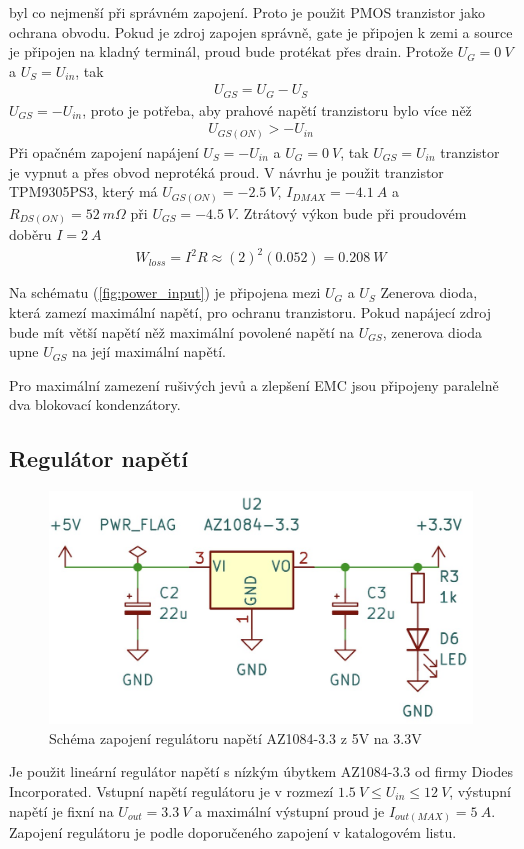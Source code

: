 byl co nejmenší při správném zapojení. Proto je použit PMOS tranzistor jako ochrana obvodu. Pokud je zdroj zapojen správně, gate je připojen k zemi a source je připojen na kladný terminál, proud bude protékat přes drain. Protože $ U_G = 0 \ V$ a $U_S = U_{in}$, tak
\begin{align*}
    U_{GS} = U_G - U_S
\end{align*}
$U_{GS} = -U_{in} $, proto je potřeba, aby prahové napětí tranzistoru bylo více něž
\begin{align*}
    U_{GS(ON)} > -U_{in}
\end{align*}
Při opačném zapojení napájení $U_S = -U_{in}$ a $ U_G = 0 \ V$, tak  $U_{GS} = U_{in}$ tranzistor je vypnut a přes obvod neprotéká proud.
V návrhu je použit tranzistor TPM9305PS3, který má  $U_{GS(ON)} = -2.5 \ V $,  $I_{D MAX} = -4.1 \ A$ a $R_{DS(ON)} = 52 \ m \Omega$ při $U_{GS} = -4.5 \ V$.
Ztrátový výkon bude při proudovém doběru $I = 2 \ A$
\begin{align*}
    W_{loss} = I^2 R \approx (2)^2 (0.052) =  0.208 \ W
\end{align*}

Na schématu (\ref{fig:power_input}) je připojena mezi $U_G$ a $U_S$ Zenerova dioda, která zamezí maximální napětí, pro ochranu tranzistoru. Pokud napájecí zdroj bude mít větší napětí něž maximální povolené napětí na $U_{GS}$, zenerova dioda upne $U_{GS}$ na její maximální napětí.
\par
Pro maximální zamezení rušivých jevů a zlepšení EMC jsou připojeny paralelně dva blokovací kondenzátory.
\subsection*{Regulátor napětí}
\begin{figure}[H]
    \includegraphics[width=0.9\linewidth]{pictures/ldo_3v3.jpg}
    \caption{Schéma zapojení regulátoru napětí AZ1084-3.3 z 5V na 3.3V}
    \label{fig:stepdown}
\end{figure}
Je použit lineární regulátor napětí s nízkým úbytkem AZ1084-3.3 od firmy Diodes Incorporated.
Vstupní napětí regulátoru je v rozmezí $1.5 \ V \leq U_{in} \leq 12 \ V $, výstupní napětí je fixní na $U_{out} = 3.3 \ V$ a maximální výstupní proud je $I_{out(MAX)} = 5 \ A$. Zapojení regulátoru je podle doporučeného zapojení v katalogovém listu.


